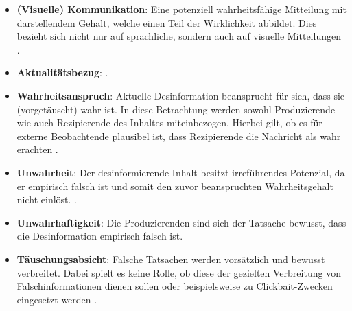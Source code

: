 \documentclass[12pt,a4paper]{article}        %
\begin{document}
\begin{itemize}
  \item \textbf{(Visuelle) Kommunikation}: Eine potenziell wahrheitsfähige Mitteilung mit darstellendem Gehalt, welche einen Teil der Wirklichkeit abbildet. Dies bezieht sich nicht nur auf sprachliche, sondern auch auf visuelle Mitteilungen \parencite[151]{marx_fake_2020}.
  \item \textbf{Aktualitätsbezug}:  \parencite[152]{marx_fake_2020}.
  \item \textbf{Wahrheitsanspruch}: Aktuelle Desinformation beansprucht für sich, dass sie (vorgetäuscht) wahr ist. In diese Betrachtung werden sowohl Produzierende wie auch Rezipierende des Inhaltes miteinbezogen. Hierbei gilt, ob es für externe Beobachtende plausibel ist, dass Rezipierende die Nachricht als wahr erachten \parencite[153]{marx_fake_2020}.
  \item \textbf{Unwahrheit}: Der desinformierende Inhalt besitzt irreführendes Potenzial, da er empirisch falsch ist und somit den zuvor beanspruchten Wahrheitsgehalt nicht einlöst. \parencite[154]{marx_fake_2020}.
  \item \textbf{Unwahrhaftigkeit}: Die Produzierenden sind sich der Tatsache bewusst, dass die Desinformation empirisch falsch ist. \parencite[156]{marx_fake_2020}
  \item \textbf{Täuschungsabsicht}: Falsche Tatsachen werden vorsätzlich und bewusst verbreitet. Dabei spielt es keine Rolle, ob diese der gezielten Verbreitung von Falschinformationen dienen sollen oder beispielsweise zu Clickbait-Zwecken eingesetzt werden \parencites[157]{marx_fake_2020}[vgl.\ auch][2]{khan_fake_2021}.
\end{itemize}
\end{document}
